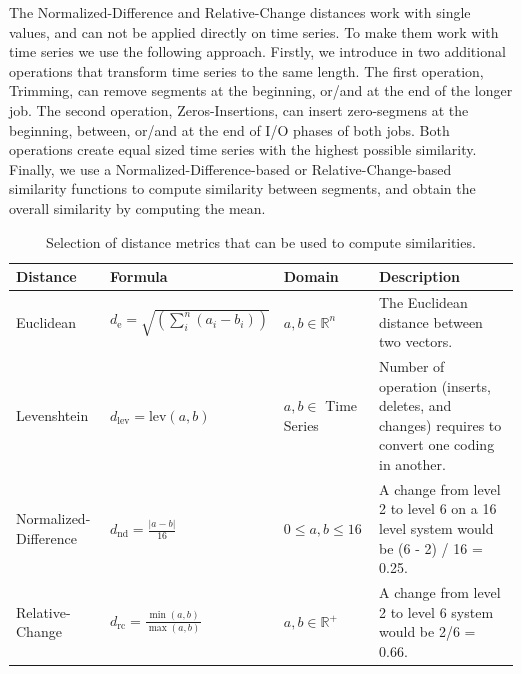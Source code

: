 \documentclass{jhps}
\begin{document}
The Normalized-Difference and Relative-Change distances work with single values, and can not be applied directly on time series.
To make them work with time series we use the following approach.
Firstly, we introduce in  two additional operations that transform time series to the same length.
The first operation, Trimming, can remove segments at the beginning, or/and at the end of the longer job.
The second operation, Zeros-Insertions, can insert zero-segmens at the beginning, between, or/and at the end of I/O phases of both jobs.
Both operations create equal sized time series with the highest possible similarity.
Finally, we use a Normalized-Difference-based or Relative-Change-based similarity functions to compute similarity between segments, and obtain the overall similarity by computing the mean.

\begin{table}
  \centering
  \begin{tabularx}{\textwidth}{lllX}
    Distance              & Formula                                       & Domain                  & Description                                                                                    \\
    \midrule
    Euclidean             & $d_{\text{e}} =\sqrt{(\sum_i^n (a_i - b_i))}$ & $a, b \in \mathbb{R}^n$ & The Euclidean distance between two vectors.                                                    \\
    Levenshtein           & $d_{\text{lev}} = \text{lev}(a, b)$           & $a, b \in$ Time Series  & Number of operation (inserts, deletes, and changes) requires to convert one coding in another. \\
    Normalized-Difference & $d_{\text{nd}} = \frac{|a - b|}{16}$          & $0 \le a, b \le 16$     & A change from level 2 to level 6 on a 16 level system would be (6 - 2) / 16 = 0.25.            \\
    Relative-Change       & $d_{\text{rc}} = \frac{\min(a,b)}{\max(a,b)}$ & $a, b \in \mathbb{R}^+$ & A change from level 2 to level 6 system would be 2/6 = 0.66.                                   \\
  \end{tabularx}
  \caption{Selection of distance metrics that can be used to compute similarities.}
  \label{tab:sim_funcs}
\end{table}
\end{document}
